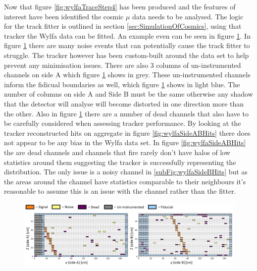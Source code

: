 Now that figure \ref{fig:wylfaTraceStep4} has been produced and the features of interest have been identified the cosmic $\mu$ data needs to be analysed. The logic for the track fitter is outlined in section \ref{sec:SimulationOfCosmics}, using that tracker the Wylfa data can be fitted. An example even can be seen in figure \ref{fig:3000ExampleEventWithKey}. In figure \ref{fig:3000ExampleEventWithKey} there are many noise events that can potentially cause the track fitter to struggle. The tracker however has been custom-built around the data set to help prevent any minimisation issues. There are also 3 columns of un-instrumented channels on side A which figure \ref{fig:3000ExampleEventWithKey} shows in grey. These un-instrumented channels inform the fidicual boundaries as well, which figure \ref{fig:3000ExampleEventWithKey} shows in light blue. The number of columns on side A and Side B must be the same otherwise any shadow that the detector will analyse will become distorted in one direction more than the other. Also in figure \ref{fig:3000ExampleEventWithKey} there are a number of dead channels that also have to be carefully considered when assessing tracker performance. By looking at the tracker reconstructed hits on aggregate in figure \ref{fig:wylfaSideABHits} there does not appear to be any bias in the Wylfa data set. In figure \ref{fig:wylfaSideABHits} the are dead channels and channels that fire rarely don't have halos of low statistics around them suggesting the tracker is successfully representing the distribution. The only issue is a noisy channel in \ref{subFig:wylfaSideBHits} but as the areas around the channel have statistics comparable to their neighbours it's reasonable to assume this is an issue with the channel rather than the fitter. 

\begin{figure}[htbp]
 \centering
 \includegraphics[width=\linewidth]{Chapter5/Figs/wylfaRasterNew/3000ExampleEventWithKey.png}
 \label{fig:3000ExampleEventWithKey}
\end{figure}

